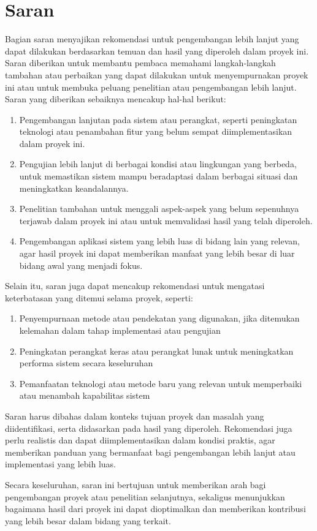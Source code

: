 \section{Saran}
\begin{sectioncontent}
    \hspace{\parindent}Bagian saran menyajikan rekomendasi untuk pengembangan lebih lanjut yang dapat dilakukan berdasarkan temuan dan hasil yang diperoleh dalam proyek ini. Saran diberikan untuk membantu pembaca memahami langkah-langkah tambahan atau perbaikan yang dapat dilakukan untuk menyempurnakan proyek ini atau untuk membuka peluang penelitian atau pengembangan lebih lanjut.
    Saran yang diberikan sebaiknya mencakup hal-hal berikut:
    \begin{enumerate}[leftmargin=0.5cm,label=\alph*.]
        \item Pengembangan lanjutan pada sistem atau perangkat, seperti peningkatan teknologi atau penambahan fitur yang belum sempat diimplementasikan dalam proyek ini.
        \item Pengujian lebih lanjut di berbagai kondisi atau lingkungan yang berbeda, untuk memastikan sistem mampu beradaptasi dalam berbagai situasi dan meningkatkan keandalannya.
        \item Penelitian tambahan untuk menggali aspek-aspek yang belum sepenuhnya terjawab dalam proyek ini atau untuk memvalidasi hasil yang telah diperoleh.
        \item Pengembangan aplikasi sistem yang lebih luas di bidang lain yang relevan, agar hasil proyek ini dapat memberikan manfaat yang lebih besar di luar bidang awal yang menjadi fokus.
    \end{enumerate}
    
    Selain itu, saran juga dapat mencakup rekomendasi untuk mengatasi keterbatasan yang ditemui selama proyek, seperti:
    \begin{enumerate}[leftmargin=0.5cm,label=\alph*.]
        \item Penyempurnaan metode atau pendekatan yang digunakan, jika ditemukan kelemahan dalam tahap implementasi atau pengujian
        \item Peningkatan perangkat keras atau perangkat lunak untuk meningkatkan performa sistem secara keseluruhan
        \item Pemanfaatan teknologi atau metode baru yang relevan untuk memperbaiki atau menambah kapabilitas sistem
    \end{enumerate}
    
    Saran harus dibahas dalam konteks tujuan proyek dan masalah yang diidentifikasi, serta didasarkan pada hasil yang diperoleh. Rekomendasi juga perlu realistis dan dapat diimplementasikan dalam kondisi praktis, agar memberikan panduan yang bermanfaat bagi pengembangan lebih lanjut atau implementasi yang lebih luas.
    
    Secara keseluruhan, saran ini bertujuan untuk memberikan arah bagi pengembangan proyek atau penelitian selanjutnya, sekaligus menunjukkan bagaimana hasil dari proyek ini dapat dioptimalkan dan memberikan kontribusi yang lebih besar dalam bidang yang terkait.
\end{sectioncontent}